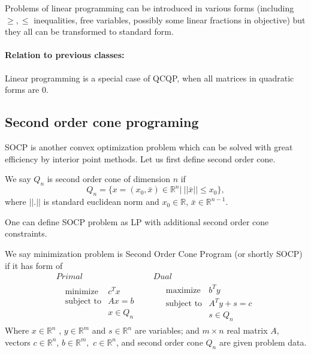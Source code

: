 \documentclass[10pt,oneside]{book}
\theoremstyle{definition}
\begin{document}
\bigskip

\rem Problems of linear programming can be introduced in various forms (including $\geq , \leq$ inequalities, free variables, possibly some linear fractions in objective) but they all can be transformed to standard form.

\paragraph{Relation to previous classes:}
Linear programming is a special case of QCQP, when all matrices in quadratic forms are 0.


\subsection{Second order cone programing}
\label{SectionSOCP}


SOCP is another convex optimization problem which can be solved with great efficiency by interior point methods. Let us first define second order cone.

\label{defSOC} We say $Q_n$ is second order cone of dimension $n$ if 
$$Q_n=\{x = (x_0,\bar{x}) \in \mathbb{R}^n|\ ||\bar{x}||\leq x_0\},$$
where $||.|| $ is standard euclidean norm and $x_0\in \mathbb{R}$, $\bar{x}\in \mathbb{R}^{n-1}$.

One can define SOCP problem as LP with additional second order cone constraints.

\label{defSOCP}
We say minimization problem is Second Order Cone Program (or shortly SOCP) if it has form of
\begin{equation}
\label{socp} 
\begin{array}{c|c}
Primal & Dual \\
\ \ \ \begin{array}{ll}
\mbox{minimize} & c^Tx\\
\mbox{subject to}& Ax = b\\
& x \in Q_n
\end{array} 
 \ \ \ \ \ & \ \ \ \ \ 
 \begin{array}{ll}
\mbox{maximize} & b^Ty\\
\mbox{subject to}& A^Ty + s = c\\
& s \in Q_n
\end{array}
\end{array}
\tag{SOCP}
\end{equation}
Where $x\in \mathbb{R}^n$ , $y\in \mathbb{R}^m$ and $s\in \mathbb{R}^n$ are variables; and $m\times n$ real matrix $A$, vectors $c\in \mathbb{R}^n$, $b\in \mathbb{R}^{m},$ $c\in \mathbb{R}^n$, and second order cone $Q_n$ are given problem data.
\end{document}
